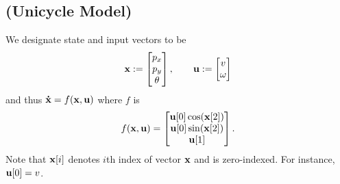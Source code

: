 \documentclass{homework}
\begin{document}
\subsection{(Unicycle Model)}

We designate state and input vectors to be
\begin{equation}
    {\bf x} := \begin{bmatrix}
        p_x \\
        p_y \\
        \theta \\
    \end{bmatrix}, \qquad {\bf u} := \begin{bmatrix}
        v \\ \omega
    \end{bmatrix}
\end{equation}
and thus ${\bf \dot{x}} = f({\bf x}, {\bf u})$ where $f$ is
\begin{equation}
    f({\bf x}, {\bf u}) = \begin{bmatrix}
        {\bf u}[0] \cos ({\bf x}[2]) \\
        {\bf u}[0] \sin ({\bf x}[2]) \\
        {\bf u}[1]
    \end{bmatrix}.
\end{equation}
Note that ${\bf x}[i]$ denotes $i$th index of vector ${\bf x}$ and is zero-indexed.
For instance, ${\bf u}[0] = v$.
\end{document}
